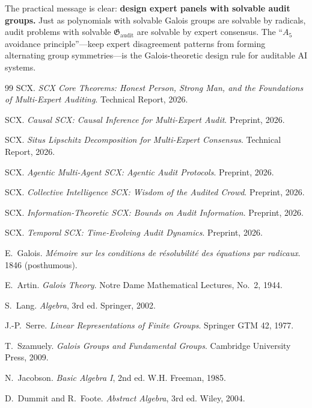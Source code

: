 \documentclass[12pt,a4paper]{article}
\theoremstyle{remark}
\newcommand{\AuditGrp}{\mathfrak{G}_{\mathrm{audit}}}
\begin{document}
The practical message is clear: \textbf{design expert panels with solvable audit groups.} Just as polynomials with solvable Galois groups are solvable by radicals, audit problems with solvable \(\AuditGrp\) are solvable by expert consensus. The ``\(A_5\) avoidance principle''---keep expert disagreement patterns from forming alternating group symmetries---is the Galois-theoretic design rule for auditable AI systems.
\begin{thebibliography}{99}
SCX.
\emph{SCX Core Theorems: Honest Person, Strong Man, and the Foundations of Multi-Expert Auditing}.
Technical Report, 2026.

SCX.
\emph{Causal SCX: Causal Inference for Multi-Expert Audit}.
Preprint, 2026.

SCX.
\emph{Situs Lipschitz Decomposition for Multi-Expert Consensus}.
Technical Report, 2026.

SCX.
\emph{Agentic Multi-Agent SCX: Agentic Audit Protocols}.
Preprint, 2026.

SCX.
\emph{Collective Intelligence SCX: Wisdom of the Audited Crowd}.
Preprint, 2026.

SCX.
\emph{Information-Theoretic SCX: Bounds on Audit Information}.
Preprint, 2026.

SCX.
\emph{Temporal SCX: Time-Evolving Audit Dynamics}.
Preprint, 2026.

E.~Galois.
\emph{M\'emoire sur les conditions de r\'esolubilit\'e des \'equations par radicaux}.
1846 (posthumous).

E.~Artin.
\emph{Galois Theory}.
Notre Dame Mathematical Lectures, No.~2, 1944.

S.~Lang.
\emph{Algebra}, 3rd ed.
Springer, 2002.

J.-P.~Serre.
\emph{Linear Representations of Finite Groups}.
Springer GTM 42, 1977.

T.~Szamuely.
\emph{Galois Groups and Fundamental Groups}.
Cambridge University Press, 2009.

N.~Jacobson.
\emph{Basic Algebra I}, 2nd ed.
W.H. Freeman, 1985.

D.~Dummit and R.~Foote.
\emph{Abstract Algebra}, 3rd ed.
Wiley, 2004.
\end{thebibliography}
\appendix
\end{document}
